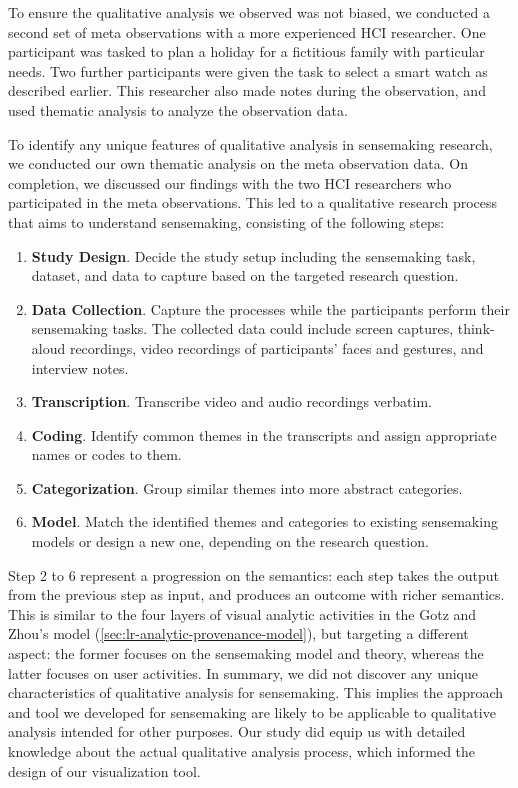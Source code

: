 To ensure the qualitative analysis we observed was not biased, we conducted a second set of meta observations with a more experienced HCI researcher. One participant was tasked to plan a holiday for a fictitious family with particular needs. Two further participants were given the task to select a smart watch as described earlier. This researcher also made notes during the observation, and used thematic analysis to analyze the observation data.

To identify any unique features of qualitative analysis in sensemaking research, we conducted our own thematic analysis on the meta observation data. On completion, we discussed our findings with the two HCI researchers who participated in the meta observations. This led to a qualitative research process that aims to understand sensemaking, consisting of the following steps:

\begin{enumerate}
	\item \textbf{Study Design}. Decide the study setup including the sensemaking task, dataset, and data to capture based on the targeted research question.
	\item \textbf{Data Collection}. Capture the processes while the participants perform their sensemaking tasks. The collected data could include screen captures, think-aloud recordings, video recordings of participants' faces and gestures, and interview notes.
	\item \textbf{Transcription}. Transcribe video and audio recordings verbatim.
	\item \textbf{Coding}. Identify common themes in the transcripts and assign appropriate names or codes to them.
	\item \textbf{Categorization}. Group similar themes into more abstract categories.
	\item \textbf{Model}. Match the identified themes and categories to existing sensemaking models or design a new one, depending on the research question.
\end{enumerate}

Step 2 to 6 represent a progression on the semantics: each step takes the output from the previous step as input, and produces an outcome with richer semantics. This is similar to the four layers of visual analytic activities in the Gotz and Zhou's model (\autoref{sec:lr-analytic-provenance-model}), but targeting a different aspect: the former focuses on the sensemaking model and theory, whereas the latter focuses on user activities. In summary, we did not discover any unique characteristics of qualitative analysis for sensemaking. This implies the approach and tool we developed for sensemaking are likely to be applicable to qualitative analysis intended for other purposes. Our study did equip us with detailed knowledge about the actual qualitative analysis process, which informed the design of our visualization tool.

